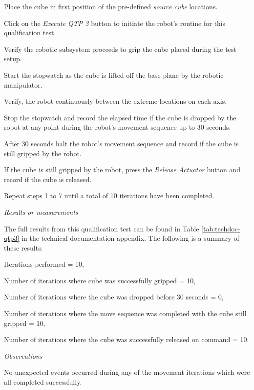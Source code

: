 \begin{compactenum}
	\item Place the cube in first position of the pre-defined \textit{source cube} locations.
	\item Click on the \textit{Execute QTP 3} button to initiate the robot's routine for this qualification test.
	\item Verify the robotic subsystem proceeds to grip the cube placed during the test setup.
	\item Start the stopwatch as the cube is lifted off the base plane by the robotic manipulator.
	\item Verify, the robot continuously between the extreme locations on each axis.
	\item Stop the stopwatch and record the elapsed time if the cube is dropped by the robot at any point during the robot's movement sequence up to 30 seconds.
	\item After 30 seconds halt the robot's movement sequence and record if the cube is still gripped by the robot.
	\item If the cube is still gripped by the robot, press the \textit{Release Actuator} button and record if the cube is released.
	\item Repeat steps 1 to 7 until a total of 10 iterations have been completed.
\end{compactenum}

\textit{Results or measurements}

The full results from this qualification test can be found in Table \ref{tab:techdoc-qtp3} in the technical documentation appendix. The following is a summary of these results:

\begin{compactitem}
	\item Iterations performed = 10,
	\item Number of iterations where cube was successfully gripped = 10,
	\item Number of iterations where the cube was dropped before 30 seconds = 0,
	\item Number of iterations where the move sequence was completed with the cube still gripped = 10,
	\item Number of iterations where the cube was successfully released on command = 10.
\end{compactitem}

\textit{Observations}

No unexpected events occurred during any of the movement iterations which were all completed successfully.

